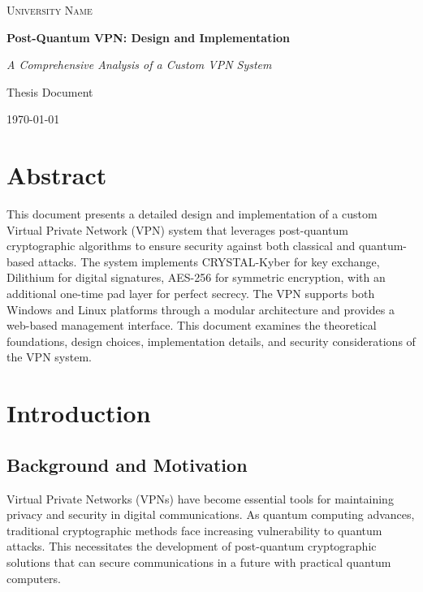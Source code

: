 \documentclass[12pt,a4paper]{report}
\begin{document}
\begin{titlepage}
    \centering
    \vspace*{1cm}
    {\scshape\LARGE University Name \par}
    \vspace{1.5cm}
    {\huge\bfseries Post-Quantum VPN: Design and Implementation\par}
    \vspace{2cm}
    {\Large\itshape A Comprehensive Analysis of a Custom VPN System\par}
    \vfill
    {\large Thesis Document\par}
    \vspace{1cm}
    {\large \today\par}
\end{titlepage}

\chapter*{Abstract}
This document presents a detailed design and implementation of a custom Virtual Private Network (VPN) system that leverages post-quantum cryptographic algorithms to ensure security against both classical and quantum-based attacks. The system implements CRYSTAL-Kyber for key exchange, Dilithium for digital signatures, AES-256 for symmetric encryption, with an additional one-time pad layer for perfect secrecy. The VPN supports both Windows and Linux platforms through a modular architecture and provides a web-based management interface. This document examines the theoretical foundations, design choices, implementation details, and security considerations of the VPN system.

\tableofcontents
\listoffigures
\listoftables

\chapter{Introduction}
\section{Background and Motivation}
Virtual Private Networks (VPNs) have become essential tools for maintaining privacy and security in digital communications. As quantum computing advances, traditional cryptographic methods face increasing vulnerability to quantum attacks. This necessitates the development of post-quantum cryptographic solutions that can secure communications in a future with practical quantum computers.
\end{document}

